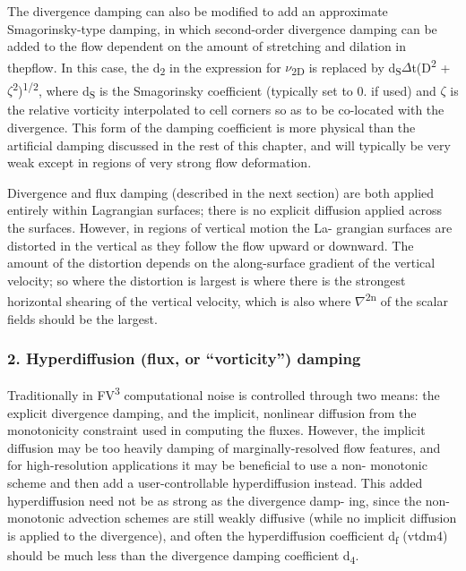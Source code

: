 The divergence damping can also be modified to add an approximate Smagorinsky-\/type damping, in which second-\/order divergence damping can be added to the flow dependent on the amount of stretching and dilation in thepflow. In this case, the d\textsubscript{2} in the expression for {$\nu$}\textsubscript{2D} is replaced by d\textsubscript{S}{$\Delta$}t(D\textsuperscript{2} + {$\zeta$}\textsuperscript{2})\textsuperscript{1/2}, where d\textsubscript{S} is the Smagorinsky coefficient (typically set to 0. if used) and {$\zeta$} is the relative vorticity interpolated to cell corners so as to be co-\/located with the divergence. This form of the damping coefficient is more physical than the artificial damping discussed in the rest of this chapter, and will typically be very weak except in regions of very strong flow deformation.

Divergence and flux damping (described in the next section) are both applied entirely within Lagrangian surfaces; there is no explicit diffusion applied across the surfaces. However, in regions of vertical motion the La-\/ grangian surfaces are distorted in the vertical as they follow the flow upward or downward. The amount of the distortion depends on the along-\/surface gradient of the vertical velocity; so where the distortion is largest is where there is the strongest horizontal shearing of the vertical velocity, which is also where {$\nabla$}\textsuperscript{2n} of the scalar fields should be the largest.

\subsubsection*{2. Hyperdiffusion (flux, or “vorticity”) damping}

Traditionally in FV\textsuperscript{3} computational noise is controlled through two means\+: the explicit divergence damping, and the implicit, nonlinear diffusion from the monotonicity constraint used in computing the fluxes. However, the implicit diffusion may be too heavily damping of marginally-\/resolved flow features, and for high-\/resolution applications it may be beneficial to use a non-\/ monotonic scheme and then add a user-\/controllable hyperdiffusion instead. This added hyperdiffusion need not be as strong as the divergence damp-\/ ing, since the non-\/monotonic advection schemes are still weakly diffusive (while no implicit diffusion is applied to the divergence), and often the hyperdiffusion coefficient d\textsubscript{f} ({\ttfamily vtdm4}) should be much less than the divergence damping coefficient d\textsubscript{4}.

